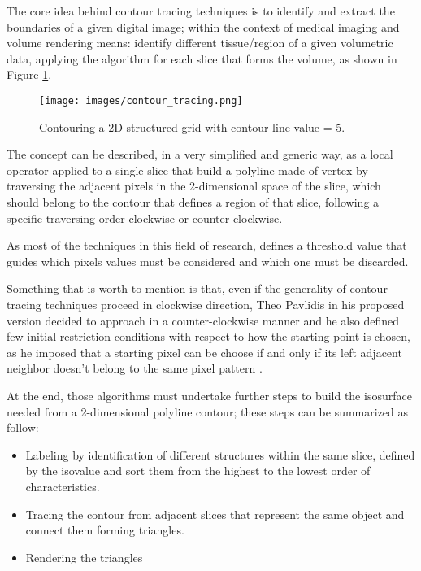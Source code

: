 \documentclass[12pt,a4paper]{extarticle}
\newcommand{\linespace}{\vspace{0pt}}
\begin{document}
The core idea behind contour tracing techniques is to identify and extract the boundaries of a given digital image; within the context of medical imaging and volume rendering means: identify different tissue/region of a given volumetric data, applying the algorithm for each slice that forms the volume, as shown in Figure \ref{fig:contouring2d}. 

\begin{figure}[hbtp]
\centering
\texttt{[image: images/contour\_tracing.png]}
\caption{Contouring a 2D structured grid with contour line value = 5.}
\label{fig:contouring2d}
\end{figure}


The concept can be described, in a very simplified and generic way, as a local operator %
applied to a single slice that build a polyline made of vertex by traversing the adjacent pixels in the 2-dimensional space of the slice, which should belong to the contour that defines a region of that slice, following a specific traversing order clockwise or counter-clockwise. 

As most of the techniques in this field of research, defines a threshold value that guides which pixels values must be considered and which one must be discarded.

Something that is worth to mention is that, even if the generality of contour tracing techniques proceed in clockwise direction, Theo Pavlidis in his proposed version decided to approach in a counter-clockwise manner and he also defined few initial restriction conditions with respect to how the starting point is chosen, as he imposed that a starting pixel can be choose if and only if its left adjacent neighbor doesn't belong to the same pixel pattern \cite{Ghuneim2007Mar}.
\linespace

At the end, those algorithms must undertake further steps to build the isosurface needed from a 2-dimensional polyline contour; these steps can be summarized as follow:
\begin{itemize}
\item Labeling by identification of different structures within the same slice, defined by the isovalue and sort them from the highest to the lowest order of characteristics.
\item Tracing the contour from adjacent slices that represent the same object and connect them forming triangles.
\item Rendering the triangles
\end{itemize}
\end{document}
